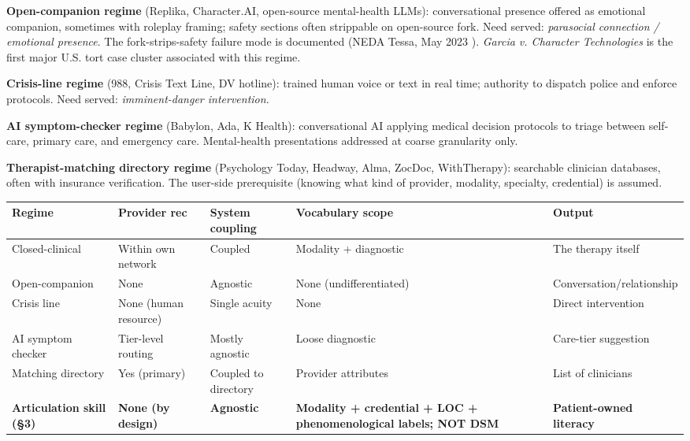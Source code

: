 \documentclass[letterpaper]{article}
\begin{document}
\textbf{Open-companion regime} (Replika, Character.AI, open-source mental-health LLMs): conversational presence offered as emotional companion, sometimes with roleplay framing; safety sections often strippable on open-source fork. Need served: \emph{parasocial connection / emotional presence}. The fork-strips-safety failure mode is documented (NEDA Tessa, May 2023 \citep{aiid2023neda}). \emph{Garcia v. Character Technologies} \citep{garcia2025character} is the first major U.S. tort case cluster associated with this regime.

\textbf{Crisis-line regime} (988, Crisis Text Line, DV hotline): trained human voice or text in real time; authority to dispatch police and enforce protocols. Need served: \emph{imminent-danger intervention}.

\textbf{AI symptom-checker regime} (Babylon, Ada, K Health): conversational AI applying medical decision protocols to triage between self-care, primary care, and emergency care. Mental-health presentations addressed at coarse granularity only.

\textbf{Therapist-matching directory regime} (Psychology Today, Headway, Alma, ZocDoc, WithTherapy): searchable clinician databases, often with insurance verification. The user-side prerequisite (knowing what kind of provider, modality, specialty, credential) is assumed.

\begin{table}[ht]
\centering
\footnotesize
\begin{tabular}{p{}p{}p{}p{}p{}}
\toprule
Regime & Provider rec & System coupling & Vocabulary scope & Output \\
\midrule
Closed-clinical & Within own network & Coupled & Modality + diagnostic & The therapy itself \\
Open-companion & None & Agnostic & None (undifferentiated) & Conversation/relationship \\
Crisis line & None (human resource) & Single acuity & None & Direct intervention \\
AI symptom checker & Tier-level routing & Mostly agnostic & Loose diagnostic & Care-tier suggestion \\
Matching directory & Yes (primary) & Coupled to directory & Provider attributes & List of clinicians \\
\textbf{Articulation skill (\S3)} & \textbf{None (by design)} & \textbf{Agnostic} & \textbf{Modality + credential + LOC + phenomenological labels; NOT DSM} & \textbf{Patient-owned literacy} \\
\bottomrule
\end{tabular}
\end{table}
\end{document}
